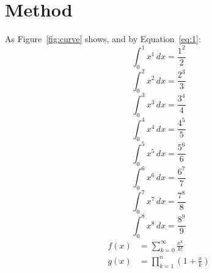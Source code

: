 \section{Method}
As Figure~\ref{fig:curve} shows, and by Equation~\eqref{eq:1}:
\begin{equation} \int_0^{1} x^{1}\,dx = \frac{1^{2}}{2} \label{eq:1}\end{equation}
\lipsum[14]
\begin{equation} \int_0^{2} x^{2}\,dx = \frac{2^{3}}{3} \label{eq:2}\end{equation}
\lipsum[15]
\begin{equation} \int_0^{3} x^{3}\,dx = \frac{3^{4}}{4} \label{eq:3}\end{equation}
\lipsum[16]
\begin{equation} \int_0^{4} x^{4}\,dx = \frac{4^{5}}{5} \label{eq:4}\end{equation}
\lipsum[17]
\begin{equation} \int_0^{5} x^{5}\,dx = \frac{5^{6}}{6} \label{eq:5}\end{equation}
\lipsum[18]
\begin{equation} \int_0^{6} x^{6}\,dx = \frac{6^{7}}{7} \label{eq:6}\end{equation}
\lipsum[19]
\begin{equation} \int_0^{7} x^{7}\,dx = \frac{7^{8}}{8} \label{eq:7}\end{equation}
\lipsum[20]
\begin{equation} \int_0^{8} x^{8}\,dx = \frac{8^{9}}{9} \label{eq:8}\end{equation}
\lipsum[21]
\begin{align}
f(x) &= \sum_{k=0}^{\infty} \frac{x^k}{k!} \\ g(x) &= \prod_{k=1}^{n} \left(1 + \frac{x}{k}\right)
\end{align}
